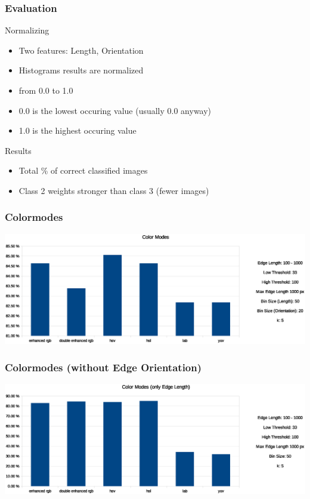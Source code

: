 \documentclass{beamer}
\begin{document}
\begin{frame}
	\frametitle{Evaluation}
	\begin{block}{Normalizing}
		\begin{itemize}
            \item Two features: Length, Orientation
			\item Histograms results are normalized
			\item from 0.0 to 1.0
			\item 0.0 is the lowest occuring value (usually 0.0 anyway)
			\item 1.0 is the highest occuring value
		\end{itemize}
	\end{block}
	\begin{block}{Results}
		\begin{itemize}
            \item Total \% of correct classified images
			\item Class 2 weights stronger than class 3 (fewer images)
		\end{itemize}
	\end{block}
\end{frame}

\begin{frame}
	\frametitle{Colormodes}
    \begin{center}
    \includegraphics[width=\textwidth]{colormodes.eps}
    \end{center}
\end{frame}

\begin{frame}
	\frametitle{Colormodes (without Edge Orientation)}
    \begin{center}
    \includegraphics[width=\textwidth]{colormodes_without_orient.eps}
    \end{center}
\end{frame}
\end{document}
